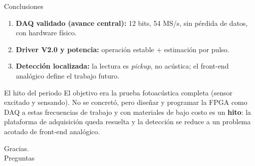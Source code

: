 \documentclass[aspectratio=169,12pt]{beamer}
\begin{document}
\begin{frame}{Conclusiones}
  \begin{enumerate}
    \item \textbf{DAQ validado (avance central):} 12 bits, 54 MS/s, sin pérdida de
      datos, con hardware físico.
    \item \textbf{Driver V2.0 y potencia:} operación estable + estimación por pulso.
    \item \textbf{Detección localizada:} la lectura es \textit{pickup}, no acústica;
      el front-end analógico define el trabajo futuro.
  \end{enumerate}
  \begin{block}{El hito del periodo}
    El objetivo era la prueba fotoacústica completa (sensor excitado y sensando). No
    se concretó, pero \alert{diseñar y programar la FPGA como DAQ a estas frecuencias
    de trabajo y con materiales de bajo costo es un \textbf{hito}}: la plataforma de
    adquisición queda resuelta y la detección se reduce a un problema acotado de
    front-end analógico.
  \end{block}
\end{frame}

\begin{frame}[standout]
  Gracias.\\[4pt]
  \small Preguntas
\end{frame}
\end{document}
